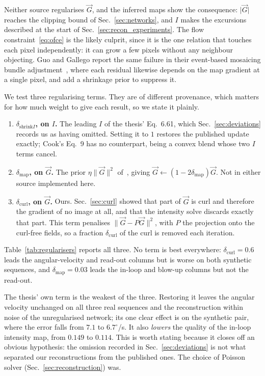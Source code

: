 \documentclass[journal]{IEEEtran}
\newcommand{\Imap}{I}
\newcommand{\Gmap}{\vec{G}}
\begin{document}
Neither source regularises $\Gmap$, and the inferred maps show the consequence:
$\lvert\Gmap\rvert$ reaches the clipping bound of
Sec.~\ref{sec:networks}, and $\Imap$ makes the excursions described at the
start of Sec.~\ref{sec:recon_experiments}. The flow
constraint~\eqref{eq:ofce} is the likely culprit, since it is the one relation
that touches each pixel independently: it can grow a few pixels without any
neighbour objecting. Guo and Gallego report the same failure in their
event-based mosaicing bundle adjustment~\cite{guo2024emba}, where each residual
likewise depends on the map gradient at a single pixel, and add a shrinkage
prior to suppress it.

We test three regularising terms. They are of different provenance, which
matters for how much weight to give each result, so we state it plainly.

\begin{enumerate}
\item \textbf{$\delta_{\text{shrink}I}$, on $\Imap$.} The leading $\Imap$ of
  the thesis' Eq.~6.61, which Sec.~\ref{sec:deviations} records us as having
  omitted. Setting it to $1$ restores the published update exactly; Cook's
  Eq.~9 has no counterpart, being a convex blend whose two $\Imap$ terms
  cancel.
\item \textbf{$\delta_{\text{map}}$, on $\Gmap$.} The prior
  $\eta\lVert\Gmap\rVert^2$ of~\cite{guo2024emba}, giving
  $\Gmap \leftarrow (1-2\delta_{\text{map}})\Gmap$. Not in either source
  implemented here.
\item \textbf{$\delta_{\text{curl}}$, on $\Gmap$.} Ours. Sec.~\ref{sec:curl}
  showed that part of $\Gmap$ is curl and therefore the gradient of no image
  at all, and that the intensity solve discards exactly that part. This
  term penalises $\lVert\Gmap - P\Gmap\rVert^2$, with $P$ the projection onto
  the curl-free fields, so a fraction $\delta_{\text{curl}}$ of the curl is
  removed each iteration.
\end{enumerate}

Table~\ref{tab:regularisers} reports all three. No term is best everywhere:
$\delta_{\text{curl}} = 0.6$ leads the angular-velocity and read-out columns
but is worse on both synthetic sequences, and $\delta_{\text{map}} = 0.03$
leads the in-loop and blow-up columns but not the read-out.

The thesis' own term is the weakest of the three. Restoring it leaves the
angular velocity unchanged on all three real sequences and the reconstruction
within noise of the unregularised network; its one clear effect is on the
synthetic pair, where the error falls from $7.1$ to $6.7^\circ$/s. It also
\emph{lowers} the quality of the in-loop intensity map, from $0.149$ to $0.114$.
This is worth stating because it closes off an obvious hypothesis: the omission
recorded in Sec.~\ref{sec:deviations} is not what separated our reconstructions
from the published ones. The choice of Poisson solver
(Sec.~\ref{sec:reconstruction}) was.
\end{document}
